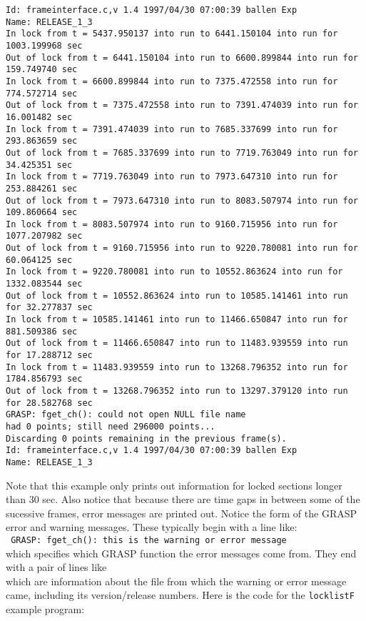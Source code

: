 {\begin{verbatim}
Id: frameinterface.c,v 1.4 1997/04/30 07:00:39 ballen Exp 
Name: RELEASE_1_3  
In lock from t = 5437.950137 into run to 6441.150104 into run for 1003.199968 sec
Out of lock from t = 6441.150104 into run to 6600.899844 into run for 159.749740 sec
In lock from t = 6600.899844 into run to 7375.472558 into run for 774.572714 sec
Out of lock from t = 7375.472558 into run to 7391.474039 into run for 16.001482 sec
In lock from t = 7391.474039 into run to 7685.337699 into run for 293.863659 sec
Out of lock from t = 7685.337699 into run to 7719.763049 into run for 34.425351 sec
In lock from t = 7719.763049 into run to 7973.647310 into run for 253.884261 sec
Out of lock from t = 7973.647310 into run to 8083.507974 into run for 109.860664 sec
In lock from t = 8083.507974 into run to 9160.715956 into run for 1077.207982 sec
Out of lock from t = 9160.715956 into run to 9220.780081 into run for 60.064125 sec
In lock from t = 9220.780081 into run to 10552.863624 into run for 1332.083544 sec
Out of lock from t = 10552.863624 into run to 10585.141461 into run for 32.277837 sec
In lock from t = 10585.141461 into run to 11466.650847 into run for 881.509386 sec
Out of lock from t = 11466.650847 into run to 11483.939559 into run for 17.288712 sec
In lock from t = 11483.939559 into run to 13268.796352 into run for 1784.856793 sec
Out of lock from t = 13268.796352 into run to 13297.379120 into run for 28.582768 sec
GRASP: fget_ch(): could not open NULL file name
had 0 points; still need 296000 points...
Discarding 0 points remaining in the previous frame(s).
Id: frameinterface.c,v 1.4 1997/04/30 07:00:39 ballen Exp 
Name: RELEASE_1_3  
\end{verbatim}
}

Note that this example only prints out information for locked sections
longer than 30 sec.  Also notice that because there are time gaps in
between some of the sucessive frames, error messages are printed out.
Notice the form of the GRASP error and warning messages.  These typically
begin with a line like:\\
{\tt 
\indent GRASP: fget\_ch(): this is the warning or error message\\ }
which specifies which GRASP function
the error messages come from.  They end with a pair of lines like\\ 
which are information about the file from which the warning or error message
came, including its version/release numbers.
Here is the code for the {\tt locklistF} example program:

